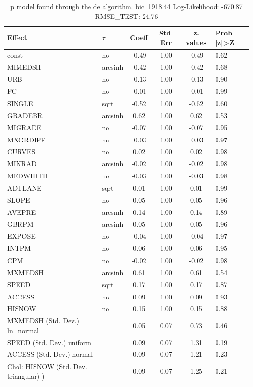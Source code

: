 \begin{table}
	\caption{p model found through the de algorithm. bic: 1918.44 Log-Likelihood: -670.87 RMSE_TEST: 24.76}
	\begin{center}
		\begin{tabular}{|l|l|c|c|c|l|}
			\hline
			Effect & $\tau$ & Coeff & Std. Err & z-values & Prob |z|>Z \\
			\hline
			const & no & -0.49 & 1.00 & -0.49 & 0.62 \\
			\hline
			MIMEDSH & arcsinh & -0.42 & 1.00 & -0.42 & 0.68 \\
			\hline
			URB & no & -0.13 & 1.00 & -0.13 & 0.90 \\
			\hline
			FC & no & -0.01 & 1.00 & -0.01 & 0.99 \\
			\hline
			SINGLE & sqrt & -0.52 & 1.00 & -0.52 & 0.60 \\
			\hline
			GRADEBR & arcsinh & 0.62 & 1.00 & 0.62 & 0.53 \\
			\hline
			MIGRADE & no & -0.07 & 1.00 & -0.07 & 0.95 \\
			\hline
			MXGRDIFF & no & -0.03 & 1.00 & -0.03 & 0.97 \\
			\hline
			CURVES & no & 0.02 & 1.00 & 0.02 & 0.98 \\
			\hline
			MINRAD & arcsinh & -0.02 & 1.00 & -0.02 & 0.98 \\
			\hline
			MEDWIDTH & no & -0.03 & 1.00 & -0.03 & 0.98 \\
			\hline
			ADTLANE & sqrt & 0.01 & 1.00 & 0.01 & 0.99 \\
			\hline
			SLOPE & no & 0.05 & 1.00 & 0.05 & 0.96 \\
			\hline
			AVEPRE & arcsinh & 0.14 & 1.00 & 0.14 & 0.89 \\
			\hline
			GBRPM & arcsinh & 0.05 & 1.00 & 0.05 & 0.96 \\
			\hline
			EXPOSE & no & -0.04 & 1.00 & -0.04 & 0.97 \\
			\hline
			INTPM & no & 0.06 & 1.00 & 0.06 & 0.95 \\
			\hline
			CPM & no & -0.02 & 1.00 & -0.02 & 0.98 \\
			\hline
			MXMEDSH & arcsinh & 0.61 & 1.00 & 0.61 & 0.54 \\
			\hline
			SPEED & sqrt & 0.17 & 1.00 & 0.17 & 0.87 \\
			\hline
			ACCESS & no & 0.09 & 1.00 & 0.09 & 0.93 \\
			\hline
			HISNOW & no & 0.15 & 1.00 & 0.15 & 0.88 \\
			\hline
			MXMEDSH (Std. Dev.) ln_normal &  & 0.05 & 0.07 & 0.73 & 0.46 \\
			\hline
			SPEED (Std. Dev.) uniform &  & 0.09 & 0.07 & 1.31 & 0.19 \\
			\hline
			ACCESS (Std. Dev.) normal &  & 0.09 & 0.07 & 1.21 & 0.23 \\
			\hline
			 Chol: HISNOW (Std. Dev. triangular) ) &  & 0.09 & 0.07 & 1.25 & 0.21 \\
			\hline
		\end{tabular}
	\end{center}
\end{table}